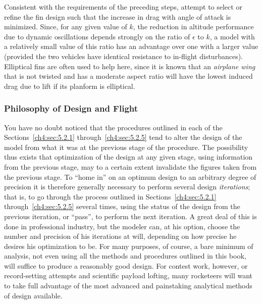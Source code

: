 Consistent with the requirements of the preceding steps, attempt to select or refine the fin design
such that the increase in drag with angle of attack is minimized. Since, for any given value of
$k$, the reduction in altitude performance due to dynamic oscillations depends strongly on the
ratio of $\epsilon$ to $k$, a model with a relatively small value of this ratio has an advantage
over one with a larger value (provided the two vehicles have identical resistance to in-flight
disturbances). Elliptical fins are often used to help here, since it is known that an
\emph{airplane wing} that is not twisted and has a moderate aspect ratio will have the lowest
induced drag due to lift if its planform is elliptical.

\subsubsection{Philosophy of Design and Flight}\label{ch4:sec:5.2.6}

You have no doubt noticed that the procedures outlined in each of the
Sections~\ref{ch4:sec:5.2.1} through~\ref{ch4:sec:5.2.5} tend to alter the design of the model from
what it was at the previous stage of the procedure. The possibility thus exists that optimization
of the design at any given stage, using information from the previous stage, may to a certain
extent invalidate the figures taken from the previous stage. To ``home in'' on an optimum design to
an arbitrary degree of precision it is therefore generally necessary to perform several design
\emph{iterations}; that is, to go through the process outlined in Sections~\ref{ch4:sec:5.2.1}
through~\ref{ch4:sec:5.2.5} several times, using the status of the design from the previous
iteration, or ``pass'', to perform the next iteration. A great deal of this is done in professional
industry, but the modeler can, at his option, choose the number and precision of his iterations at
will, depending on how precise he desires his optimization to be. For many purposes, of course, a
bare minimum of analysis, not even using all the methods and procedures outlined in this book, will
suffice to produce a reasonably good design. For contest work, however, or record-setting attempts
and scientific payload lofting, many rocketeers will want to take full advantage of the most
advanced and painstaking analytical methods of design available.

